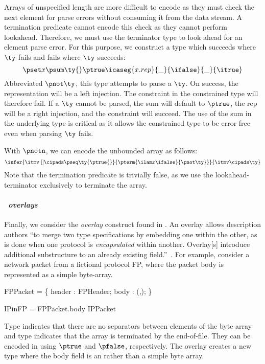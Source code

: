 Arrays of unspecified length are more difficult to encode as they must
check the next element for parse errors without consuming it from the
data stream. A termination predicate cannot encode this check as they
cannot perform lookahead. Therefore, we must use the terminator type
to look ahead for an element parse error. For this purpose, we
construct a type which succeeds where $\ty$ fails and fails where
$\ty$ succeeds:
\[
\pset x {\psum \ty {} \ptrue} {\icaseg {x.rep} {\_}
  {\ifalse} {\_} {\itrue}}
\]
\noindent
Abbreviated $\pnot \ty$, this type attempts to parse a $\ty$. On
success, the representation will be a left injection. The constraint
in the constrained type will therefore fail. If a $\ty$ cannot be
parsed, the sum will default to $\ptrue$, the rep will be a right
injection, and the constraint will succeed. The use of the sum in the
underlying type is critical as it allows the constrained type to be
error free even when parsing $\ty$ fails.

With $\pnotn$, we can encode the unbounded \datascript{} array as
follows:
\[
  \infer{
    \itmv \; [] \cipads 
    \pseq \ty {\ptrue{}} {\pterm {\ilam x {} \ifalse} {\pnot \ty}}
  }{ 
    \itmv \cipads \ty
  }
\]
Note that the termination predicate is trivially false, as we use the
lookahead-terminator exclusively to terminate the array. 

\paragraph*{\em \packettypes\ overlays}
Finally, we consider the {\it overlay} construct found in
\packettypes{}.  An overlay allows description authors ``to merge two
type specifications by embedding one within the other, as is done when
one protocol is {\it encapsulated} within another. Overlay[s]
introduce additional substructure to an already existing
field.''~\cite{sigcomm00}.  For example, consider a network packet
from a fictional protocol FP, where the packet body is represented as
a simple byte-array.
\begin{code}
FPPacket = \Pstruct \{
  header : FPHeader;
  body   : \Pbyte \Parray{}(\Pnosep,\Peof);
\}

IPinFP = \Poverlay FPPacket.body \Pwith IPPacket
\end{code}
Type \Pnosep{} indicates that there are no separators between elements
of the byte array and type \Peof{} indicates that the array is
terminated by the end-of-file. They can be encoded in \ddc{} using
$\ptrue$ and $\pfalse$, respectively. The overlay creates a new type
 where the body field is an  rather than a
simple byte array.

